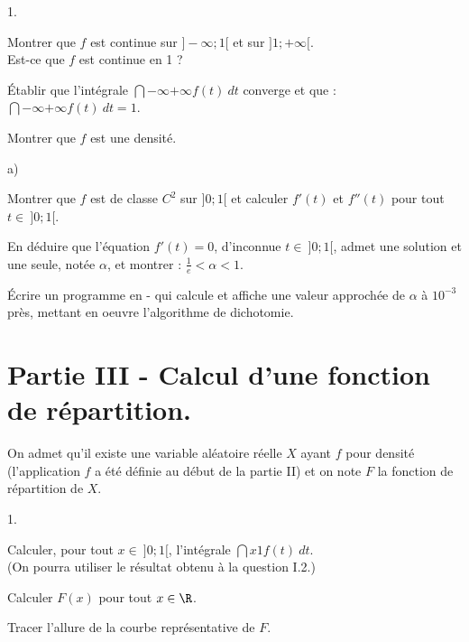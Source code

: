 \documentclass[11pt]{article}%
\begin{document}
\begin{noliste}{1.}
 \setlength{\itemsep}{4mm}

\item Montrer que $f$ est continue sur $]-\infty ; 1 [$ et sur $] 1 ; +
\infty [$. \\
Est-ce que $f$ est continue en 1 ? \\

\item Établir que l'intégrale $\dint{-\infty}{+ \infty} f(t)\ dt$
converge et que : $\dint{-\infty}{+ \infty} f(t)\ dt = 1$. \\

\item Montrer que $f$ est une densité. \\

\item \begin{noliste}{a)}
 \setlength{\itemsep}{2mm}

\item Montrer que $f$ est de classe $C^{2}$ sur $ ] 0 ; 1[ $ et
calculer $f'(t)$ et $f''(t)$ pour tout $t \in \ ]0; 1[$. \\

\item En déduire que l'équation $f'(t) = 0$, d'inconnue $t \in \ ] 0 ;
1[$, admet une solution et une seule, notée $\alpha$, et montrer :
$\frac{1}{e} < \alpha < 1$. \\

\item Écrire un programme en -\Scilab{} qui calcule et affiche une
valeur approchée de $\alpha$ à $10^{-3}$ près, mettant en oeuvre
l'algorithme de dichotomie. 

\end{noliste}
\end{noliste}

\section*{Partie III - Calcul d'une fonction de répartition.}
\noindent On admet qu'il existe une variable aléatoire réelle $X$ ayant
$f$ pour densité (l'application $f$ a été définie au début de la partie
II) et on note $F$ la fonction de répartition de $X$.

\begin{noliste}{1.}
 \setlength{\itemsep}{4mm}

\item Calculer, pour tout $x \in \ ] 0 ; 1[$, l'intégrale $\dint{x}{1}
f(t)\ dt$. \\
(On pourra utiliser le résultat obtenu à la question I.2.) \\

\item Calculer $F(x)$ pour tout $x \in \R$. \\

\item Tracer l'allure de la courbe représentative de $F$.

\end{noliste}
\end{document}

